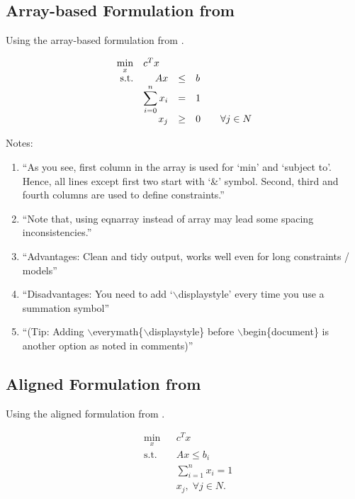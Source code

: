 \documentclass[letter,12pt]{article}
\begin{document}
\subsection{Array-based Formulation from \cite{Cay2013}}
\label{ssec:ArrayBasedFormulationFromCay2013}

Using the array-based formulation from \cite{Cay2013}.

\begin{equation}
\begin{array}{rrclcl}
\displaystyle \min_{x} & \multicolumn{3}{l}{c^T x} \\
\textrm{s.t.} & A x & \leq & b \\
&\displaystyle \sum_{i=0}^{n} x_i & = & 1 \\
& x_j & \geq & 0 & & \forall j \in N \\
\end{array}
\end{equation}


Notes: \vspace{-0.3cm}
\begin{enumerate} \itemsep -4pt
\item ``As you see, first column in the array is used for `min' and `subject to'. Hence, all lines except first two start with `\&' symbol. Second, third and fourth columns are used to define constraints.''
\item ``Note that, using eqnarray instead of array may lead some spacing inconsistencies.''
\item ``Advantages: Clean and tidy output, works well even for long constraints / models''
\item ``Disadvantages: You need to add `$\backslash$displaystyle' every time you use a summation symbol''
\item ``(Tip: Adding $\backslash$everymath\{$\backslash$displaystyle\} before $\backslash$begin\{document\} is another option as noted in comments)''
\end{enumerate}


\subsection{Aligned Formulation from \cite{Cay2013}}
\label{ssec:AlignedFormulationFromCay2013}

Using the aligned formulation from \cite{Cay2013}.



\begin{equation}
\begin{aligned}
& \underset{x}{\text{min}}
& & c^T x \\
& \text{s.t.} & &  Ax \leq b_i \\
& & &  \sum_{i=1}^{n} x_i =1 \\
& & &  x_j, \; \forall j \in N. \\
\end{aligned}
\end{equation}
\end{document}
